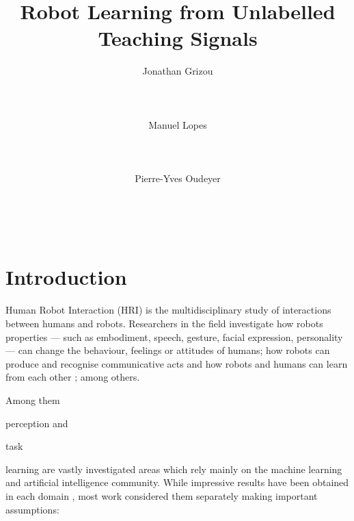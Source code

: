 \documentclass{acm_proc_article-sp}
\begin{document}
\title{Robot Learning from Unlabelled Teaching Signals}
\author{
%
\alignauthor Jonathan Grizou\\
\\
       \\
       \\
%
\alignauthor Manuel Lopes \\
\\
       \\
       \\
%
\alignauthor Pierre-Yves Oudeyer\\
	 \\
       \\
       \\
}

\maketitle

\section{Introduction}

Human Robot Interaction (HRI) is the multidisciplinary study of interactions between humans and robots. Researchers in the field investigate how robots properties --- such as embodiment, speech, gesture, facial expression, personality --- can change the behaviour, feelings or attitudes of humans; how robots can produce and recognise communicative acts and how robots and humans can learn from each other \cite{dautenhahn2007socially, fong2003survey}; among others.

Among them \begin{inparaenum}[(a)] \item perception and \item task \end{inparaenum} learning are vastly investigated areas which rely mainly on the machine learning and artificial intelligence community. While impressive results have been obtained in each domain  \cite{argall2009survey, zeng2009survey}, most work considered them separately making important assumptions:
 
\end{document}
